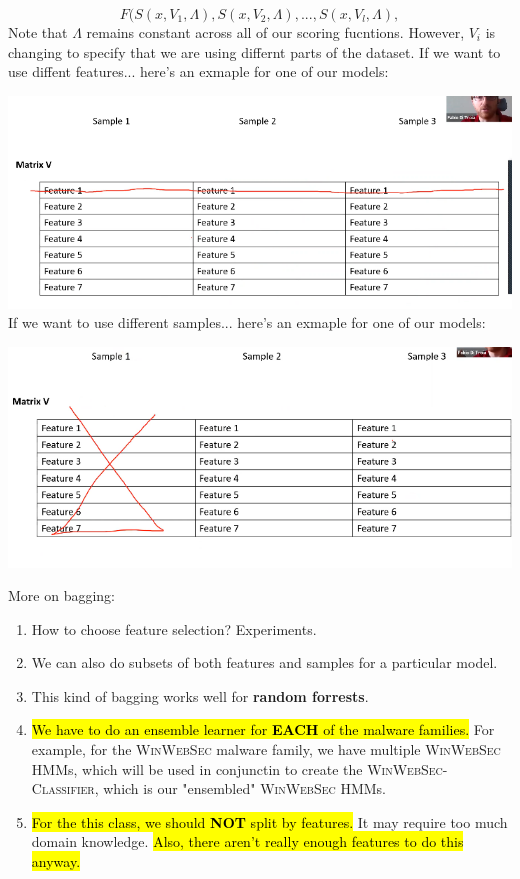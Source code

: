 \documentclass[12pt]{article}
\begin{document}
\begin{equation}
  F(S(x, V_1, \Lambda), S(x, V_2, \Lambda), ... , S(x, V_l, \Lambda),
\end{equation}
Note that $\Lambda$ remains constant across all of our scoring fucntions. However, $V_i$ is changing to specify that we are using differnt parts of the dataset.
If we want to use diffent features... here's an exmaple for one of our models:


\includegraphics[width=.8\textwidth]{diffFeatures.png}
If we want to use different samples... here's an exmaple for one of our models:


\includegraphics[width=.8\textwidth]{diffSamples.png}

More on bagging:
\begin{enumerate}
  \item How to choose feature selection? Experiments.
  \item We can also do subsets of both features and samples for a particular model.
  \item This kind of bagging works well for \textbf{random forrests}.
  \item \hl{We have to do an ensemble learner for \textbf{EACH} of the malware families.} For example, for the \textsc{WinWebSec} malware family, we have multiple \textsc{WinWebSec} HMMs, which will be used in conjunctin to create the \textsc{WinWebSec-Classifier}, which is our "ensembled" \textsc{WinWebSec} HMMs.
  \item \hl{For the this class, we should \textbf{NOT} split by features.} It may require too much domain knowledge. \hl{Also, there aren't really enough features to do this anyway.}
\end{enumerate}
\end{document}
